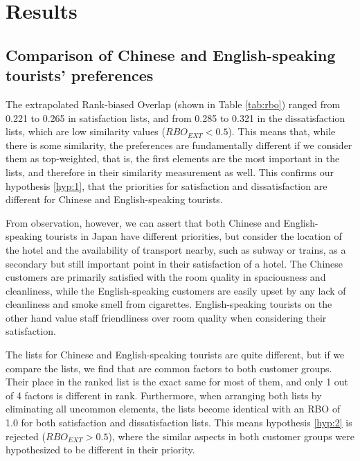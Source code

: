 \section{Results}\label{results}

\subsection{Comparison of Chinese and English-speaking tourists' preferences}

The extrapolated Rank-biased Overlap (shown in Table \ref{tab:rbo}) ranged from 0.221 to 0.265 in satisfaction lists, and from 0.285 to 0.321 in the dissatisfaction lists, which are low similarity values (\(RBO_{EXT} < 0.5\)). This means that, while there is some similarity, the preferences are fundamentally different if we consider them as top-weighted, that is, the first elements are the most important in the lists, and therefore in their similarity measurement as well. This confirms our hypothesis \ref{hyp:1}, that the priorities for satisfaction and dissatisfaction are different for Chinese and English-speaking tourists. 

From observation, however, we can assert that both Chinese and English-speaking tourists in Japan have different priorities, but consider the location of the hotel and the availability of transport nearby, such as subway or trains, as a secondary but still important point in their satisfaction of a hotel. The Chinese customers are primarily satisfied with the room quality in spaciousness and cleanliness, while the English-speaking customers are easily upset by any lack of cleanliness and smoke smell from cigarettes. English-speaking tourists on the other hand value staff friendliness over room quality when considering their satisfaction. 

The lists for Chinese and English-speaking tourists are quite different, but if we compare the lists, we find that \DIFdelbegin {}\DIFdelend \DIFaddbegin {}\DIFaddend are common factors to both customer groups. Their place in the ranked list is the exact same for most of them, and only 1 out of 4 factors is different in rank. Furthermore, when arranging both lists by eliminating all uncommon elements, the lists become identical with an RBO of 1.0 for both satisfaction and dissatisfaction lists. This means hypothesis \ref{hyp:2} is rejected (\(RBO_{EXT} > 0.5\)), where the similar aspects in both customer groups were hypothesized to be different in their priority.

